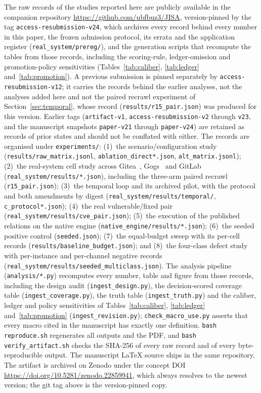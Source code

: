 The raw records of the studies reported here are publicly available in the
companion repository \url{https://github.com/ubfbuz3/JISA}, version-pinned by the
tag \texttt{access-resubmission-v24}, which archives every record behind every
number in this paper, the frozen admission protocol, its errata and the
application register
(\texttt{real\_system\allowbreak/prereg/}), and the generation scripts that
recompute the tables from those records, including the scoring-rule,
ledger-omission and promotion-policy sensitivities
(Tables~\ref{tab:caliber}, \ref{tab:ledger} and~\ref{tab:promotion}). A previous
submission is pinned separately by \texttt{access-resubmission-v12}; it carries the
records behind the earlier analyses, not the analyses added here and not the paired
recrawl experiment of Section~\ref{sec:temporal}, whose record
(\texttt{results/r15\_pair.json}) was produced for this version. Earlier tags
(\texttt{artifact-v1}, \texttt{access-resubmission-v2} through \texttt{v23}, and the
manuscript snapshots \texttt{paper-v21} through \texttt{paper-v24}) are retained as records
of prior states and should not be conflated with either.
The records are organised under
\texttt{experiments/}:
(1)~the scenario/configuration study
(\texttt{results/raw\_matrix.jsonl}, \texttt{ablation\_direct*.json},
\texttt{alt\_matrix.jsonl});
(2)~the real-system cell study across Gitea~\ResRsVersion{}, Gogs~\GgVersion{} and
GitLab~\GlVersion{} (\texttt{real\_system\allowbreak/results/*.json}), including the
three-arm paired recrawl (\texttt{r15\_pair.json});
(3)~the temporal loop and its archived pilot, with the protocol and both
amendments by digest (\texttt{real\_system\allowbreak/results\allowbreak/temporal/},
\texttt{c\_protocol*.json}); (4)~the real vulnerable/fixed pair
(\texttt{real\_system\allowbreak/results\allowbreak/cve\_pair.json});
(5)~the execution of the published relations on the native engine
(\texttt{native\_engine\allowbreak/results/*.json});
(6)~the seeded positive control (\texttt{seeded.json});
(7)~the equal-budget sweep with its per-cell records
(\texttt{results\allowbreak/baseline\_budget.json}); and
(8)~the four-class defect study with per-instance and per-channel negative
records (\texttt{real\_system\allowbreak/results\allowbreak/seeded\_multiclass.json}).
The analysis pipeline (\texttt{analysis/*.py}) recomputes every number, table and
figure from those records, including the design audit
(\texttt{ingest\_design.py}), the decision-scored coverage table
(\texttt{ingest\_coverage.py}), the truth table (\texttt{ingest\_truth.py}) and
the caliber, ledger and policy sensitivities of
Tables~\ref{tab:caliber}, \ref{tab:ledger} and~\ref{tab:promotion}
(\texttt{ingest\_revision.py});
\texttt{check\_macro\_use.py} asserts that every macro cited in the manuscript
has exactly one definition. \texttt{bash reproduce.sh} regenerates all outputs
and the PDF, and \texttt{bash verify\_artifact.sh} checks the SHA-256 of every raw
record and of every byte-reproducible output. The manuscript \LaTeX{} source ships
in the same repository. The artifact is archived on Zenodo under the concept DOI
\url{https://doi.org/10.5281/zenodo.22859941}, which always resolves to the
newest version; the git tag above is the version-pinned copy.

